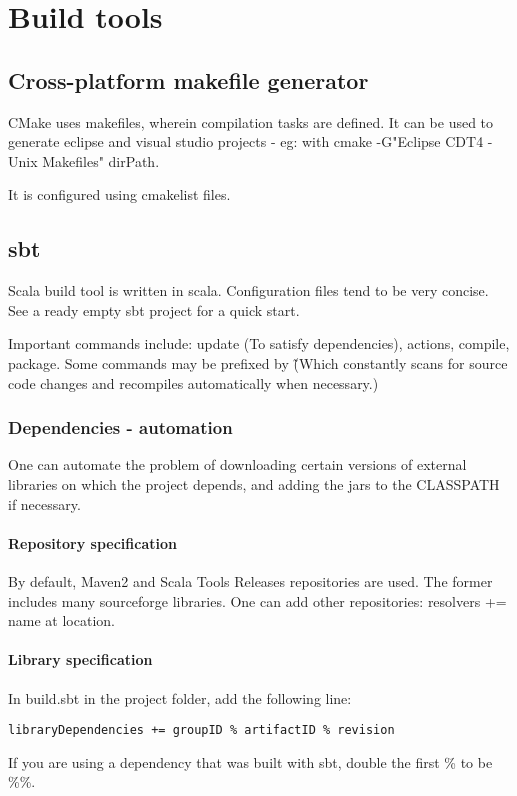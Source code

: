 \chapter{Build tools}
\section{Cross-platform makefile generator}
CMake uses makefiles, wherein compilation tasks are defined. It can be used to generate eclipse and visual studio projects - eg: with cmake -G"Eclipse CDT4 - Unix Makefiles" dirPath.

It is configured using cmakelist files.

\section{sbt}
Scala build tool is written in scala. Configuration files tend to be very concise. See a ready empty sbt project for a quick start.

Important commands include: update (To satisfy dependencies), actions, compile, package. Some commands may be prefixed by \~ (Which constantly scans for source code changes and recompiles automatically when necessary.)

\subsection{Dependencies - automation}
One can automate the problem of downloading certain versions of external libraries on which the project depends, and adding the jars to the CLASSPATH if necessary.

\subsubsection{Repository specification}
By default, Maven2 and Scala Tools Releases repositories are used. The former includes many sourceforge libraries. One can add other repositories: resolvers += name at location.

\subsubsection{Library specification}
In build.sbt in the project folder, add the following line:
\begin{verbatim}
libraryDependencies += groupID % artifactID % revision
\end{verbatim}
If you are using a dependency that was built with sbt, double the first \% to be \%\%.


